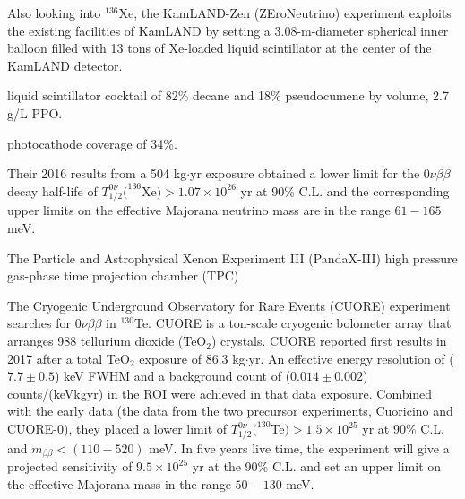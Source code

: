 Also looking into $^{136}$Xe, the KamLAND-Zen (ZEroNeutrino) experiment exploits the existing facilities of KamLAND by setting a 3.08-m-diameter spherical inner balloon filled with 13 tons of Xe-loaded liquid scintillator at the center of the KamLAND detector.

liquid scintillator cocktail of 82\% decane and 18\% pseudocumene by volume, 2.7 g/L PPO.

photocathode coverage of 34\%.

 Their 2016 results from a 504 kg$\cdot$yr exposure obtained a lower limit for the $0\nu\beta\beta$ decay half-life of $T^{0\nu}_{1/2}(^{136}$Xe$)>1.07\times 10^{26}$ yr at 90\% C.L. and the corresponding upper limits on the effective Majorana neutrino mass are in the range $61-165$ meV\cite{kamlandZen}.

The Particle and Astrophysical Xenon Experiment III (PandaX-III) 
high pressure gas-phase time projection chamber (TPC)  




The Cryogenic Underground Observatory for Rare Events (CUORE) experiment searches for $0\nu\beta\beta$ in $^{130}$Te. CUORE is a ton-scale cryogenic bolometer array that arranges 988 tellurium dioxide (TeO$_2$) crystals. CUORE reported first results in 2017 after a total TeO$_2$ exposure of 86.3 kg$\cdot$yr. An effective energy resolution of ($7.7\pm 0.5$) keV FWHM and a background count of ($0.014\pm0.002$) counts/(keVkgyr) in the ROI were achieved in that data exposure. Combined with the early data (the data from the two precursor experiments, Cuoricino and CUORE-0), they placed a lower limit of $T^{0\nu}_{1/2}(^{130}$Te$)>1.5\times 10^{25}$ yr at 90\% C.L. and $m_{\beta\beta}<(110-520)$  meV\cite{alduino2018first}. In five years live time, the experiment will give a projected sensitivity of $9.5\times 10^{25}$ yr at the 90\% C.L. and set an upper limit on the effective Majorana mass in the range $50-130$ meV\cite{piperno2015dark}.

